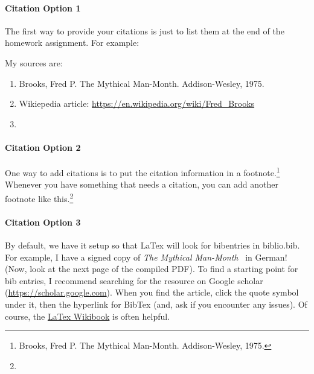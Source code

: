 \documentclass{article}
\author{Prof.~Fasy}
\begin{document}
\paragraph{Citation Option 1}

The first way to provide your citations is just to list them at the end of the
homework assignment.  For example:

My sources are:
\begin{enumerate}
    \item Brooks, Fred P. The Mythical Man-Month. Addison-Wesley, 1975.
    \item Wikiepedia article: \url{https://en.wikipedia.org/wiki/Fred_Brooks}
    \item {}
\end{enumerate}

\newpage
\paragraph{Citation Option 2}

One way to add citations is to put the citation information in a
footnote.\footnote{
Brooks, Fred P. The Mythical Man-Month. Addison-Wesley, 1975.
    }
Whenever you have something that needs a citation, you can add another footnote
like this.\footnote{}

\newpage
\paragraph{Citation Option 3}

By default, we have it setup so that LaTex will look for bibentries in
biblio.bib.   For example, I have a signed copy of
\emph{The Mythical Man-Month}~\cite{brooks1975mythical} in
German! (Now, look at the next page of the compiled PDF).
To find a starting point for bib entries, I recommend searching for the resource
on Google scholar (\url{https://scholar.google.com}).  When you find the
article, click the quote symbol under it, then the hyperlink for BibTex (and,
ask if you encounter any issues). Of course,
the \href{https://en.wikibooks.org/wiki/LaTeX/Bibliography_Management}{LaTex
Wikibook} is often
helpful.

\newpage


\end{document}

